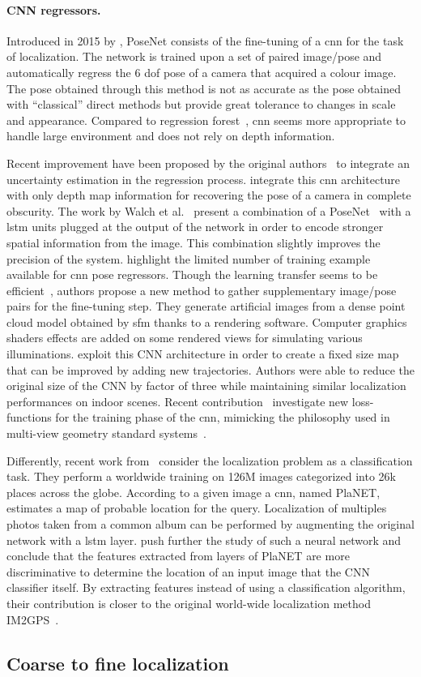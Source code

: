 \paragraph{CNN regressors.}
\label{para:cnn_regressor}
Introduced in 2015 by \citet{Kendall2015}, PoseNet consists of the fine-tuning of a \ac{cnn} for the task of localization. The network is trained upon a set of paired image/pose and automatically regress the 6 \ac{dof} pose of a camera that acquired a colour image. The pose obtained through this method is not as accurate as the pose obtained with ``classical'' direct methods \citep{Feng2016a,Sattler2016a} but provide great tolerance to changes in scale and appearance. Compared to regression forest~\citep{Valentin2015}, \ac{cnn} seems more appropriate to handle large environment and does not rely on depth information.

Recent improvement have been proposed by the original authors~\citep{Kendall2016} to integrate an uncertainty estimation in the regression process. \citet{Liu2016} integrate this \ac{cnn} architecture with only depth map information for recovering the pose of a camera in complete obscurity. The work by Walch et al.~\citep{Walch2016mastersThesis,Walch2016a} present a combination of a PoseNet~\citep{Kendall2015} with a \ac{lstm} units plugged at the output of the network in order to encode stronger spatial information from the image. This combination slightly improves the precision of the system. \citet{Jia2016} highlight the limited number of training example available for \ac{cnn} pose regressors. Though the learning transfer seems to be efficient~\citep{Kendall2015}, authors propose a new method to gather supplementary image/pose pairs for the fine-tuning step. They generate artificial images from a dense point cloud model obtained by \ac{sfm} thanks to a rendering software. Computer graphics shaders effects are added on some rendered views for simulating various illuminations. \citet{Contreras2017} exploit this CNN architecture in order to create a fixed size map that can be improved by adding new trajectories. Authors were able to reduce the original size of the CNN by factor of three while maintaining similar localization performances on indoor scenes. Recent contribution~\citep{Kendall2017} investigate new loss-functions for the training phase of the \ac{cnn}, mimicking the philosophy used in multi-view geometry standard systems~\citep{Hartley2003}.

Differently, recent work from~\citet{Weyand2016} consider the localization problem as a classification task. They perform a worldwide training on 126M images categorized into 26k places across the globe. According to a given image a \ac{cnn}, named PlaNET, estimates a map of probable location for the query. Localization of multiples photos taken from a common album can be performed by augmenting the original network with a \ac{lstm} layer. \citet{Vo2017} push further the study of such a neural network and conclude that the features extracted from layers of PlaNET are more discriminative to determine the location of an input image that the CNN classifier itself. By extracting features instead of using a classification algorithm, their contribution is closer to the original world-wide localization method IM2GPS~\citep{Hays2008}.


\subsection{Coarse to fine localization}